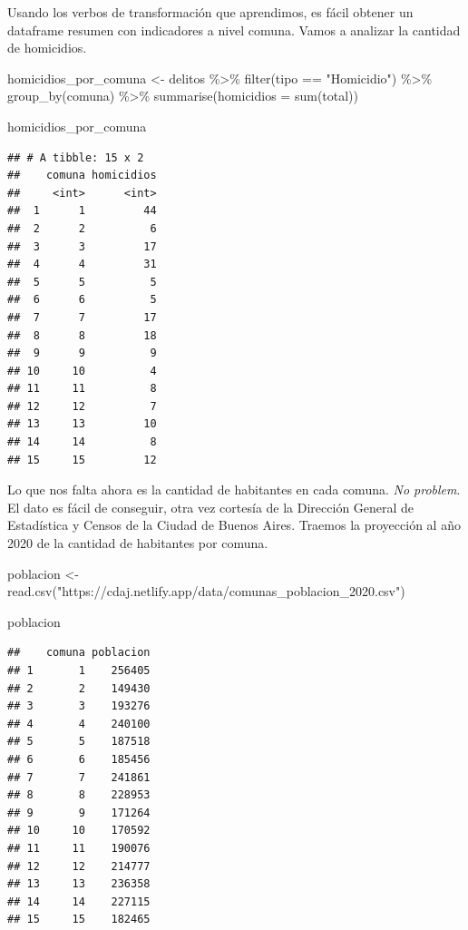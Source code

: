 \documentclass[
]{book}
\newenvironment{Shaded}{\begin{snugshade}}{\end{snugshade}}
\newcommand{\AttributeTok}[1]{\textcolor[rgb]{0.77,0.63,0.00}{#1}}
\newcommand{\FunctionTok}[1]{\textcolor[rgb]{0.00,0.00,0.00}{#1}}
\newcommand{\NormalTok}[1]{#1}
\newcommand{\OtherTok}[1]{\textcolor[rgb]{0.56,0.35,0.01}{#1}}
\newcommand{\SpecialCharTok}[1]{\textcolor[rgb]{0.00,0.00,0.00}{#1}}
\newcommand{\StringTok}[1]{\textcolor[rgb]{0.31,0.60,0.02}{#1}}
\begin{document}
Usando los verbos de transformación que aprendimos, es fácil obtener un dataframe resumen con indicadores a nivel comuna. Vamos a analizar la cantidad de homicidios.

\begin{Shaded}
\begin{Highlighting}[]
\NormalTok{homicidios\_por\_comuna }\OtherTok{\textless{}{-}}\NormalTok{ delitos }\SpecialCharTok{\%\textgreater{}\%} 
    \FunctionTok{filter}\NormalTok{(tipo }\SpecialCharTok{==} \StringTok{"Homicidio"}\NormalTok{) }\SpecialCharTok{\%\textgreater{}\%} 
    \FunctionTok{group\_by}\NormalTok{(comuna) }\SpecialCharTok{\%\textgreater{}\%} 
    \FunctionTok{summarise}\NormalTok{(}\AttributeTok{homicidios =} \FunctionTok{sum}\NormalTok{(total))}

\NormalTok{homicidios\_por\_comuna}
\end{Highlighting}
\end{Shaded}

\begin{verbatim}
## # A tibble: 15 x 2
##    comuna homicidios
##     <int>      <int>
##  1      1         44
##  2      2          6
##  3      3         17
##  4      4         31
##  5      5          5
##  6      6          5
##  7      7         17
##  8      8         18
##  9      9          9
## 10     10          4
## 11     11          8
## 12     12          7
## 13     13         10
## 14     14          8
## 15     15         12
\end{verbatim}

Lo que nos falta ahora es la cantidad de habitantes en cada comuna. \emph{No problem}. El dato es fácil de conseguir, otra vez cortesía de la Dirección General de Estadística y Censos de la Ciudad de Buenos Aires. Traemos la proyección al año 2020 de la cantidad de habitantes por comuna.

\begin{Shaded}
\begin{Highlighting}[]
\NormalTok{poblacion }\OtherTok{\textless{}{-}} \FunctionTok{read.csv}\NormalTok{(}\StringTok{"https://cdaj.netlify.app/data/comunas\_poblacion\_2020.csv"}\NormalTok{)}

\NormalTok{poblacion}
\end{Highlighting}
\end{Shaded}

\begin{verbatim}
##    comuna poblacion
## 1       1    256405
## 2       2    149430
## 3       3    193276
## 4       4    240100
## 5       5    187518
## 6       6    185456
## 7       7    241861
## 8       8    228953
## 9       9    171264
## 10     10    170592
## 11     11    190076
## 12     12    214777
## 13     13    236358
## 14     14    227115
## 15     15    182465
\end{verbatim}
\end{document}
